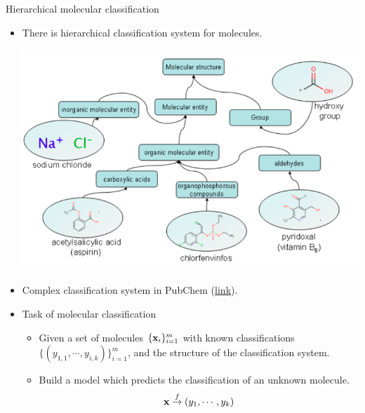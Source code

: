 \documentclass[first=dgreen,second=purple,logo=yellowexc]{aaltoslides}
\begin{document}
{\begin{frame}{Hierarchical molecular classification}
	\begin{itemize}
		\item There is hierarchical classification system for molecules.
		\begin{center}
			\includegraphics[scale=0.2]{./figures/classificationhierarchy.png}
		\end{center}
		\item Complex classification system in PubChem (\href{https://pubchem.ncbi.nlm.nih.gov/classification/\#hid=2\&cid=1\&view=tree}{link}).
		\item Task of molecular classification
		\begin{itemize}
			\footnotesize
			\item Given a set of molecules $\{\mathbf {x}_i\}_{i=1}^m$ with known classifications $\{(y_{1,1},\cdots,y_{i,k})\}_{i=1}^m$, and the structure of the classification system.
			\item Build a model which predicts the classification of an unknown molecule.
			\begin{align*}
				\mathbf {x} \overset{f}{\rightarrow} (y_{1},\cdots,y_{k})
			\end{align*}
		\end{itemize}
	\end{itemize}
\end{frame}

}
\end{document}
